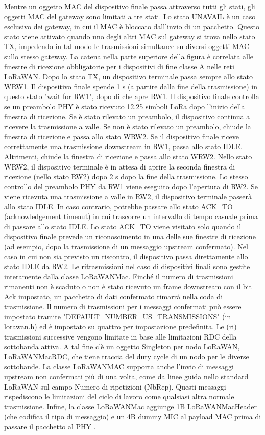 \documentclass[a4paper]{report} %
\begin{document}
Mentre un oggetto MAC del dispositivo finale passa attraverso tutti gli stati, gli oggetti MAC del gateway sono limitati a tre stati. Lo stato UNAVAIL è un caso esclusivo dei gateway, in cui il MAC è bloccato dall'invio di un pacchetto. Questo stato viene attivato quando uno degli altri MAC sul gateway si trova nello stato TX, impedendo in tal modo le trasmissioni simultanee su diversi oggetti MAC sullo stesso gateway. La catena nella parte superiore della figura è correlata alle finestre di ricezione obbligatorie per i dispositivi di fine classe A nelle reti LoRaWAN. Dopo lo stato TX, un dispositivo terminale passa sempre allo stato WRW1. Il dispositivo finale spende 1 s (a partire dalla fine della trasmissione) in questo stato "wait for RW1", dopo di che apre RW1. Il dispositivo finale controlla se un preambolo PHY è stato ricevuto 12.25 simboli LoRa dopo l'inizio della finestra di ricezione. Se è stato rilevato un preambolo, il dispositivo continua a ricevere la trasmissione a valle.
Se non è stato rilevato un preambolo, chiude la finestra di ricezione e passa allo stato WRW2. Se il dispositivo finale riceve correttamente una trasmissione downstream in RW1, passa allo stato IDLE. Altrimenti, chiude la finestra di ricezione e passa allo stato WRW2. Nello stato WRW2, il dispositivo terminale è in attesa di aprire la seconda finestra di ricezione (nello stato RW2) dopo 2 s dopo la fine della trasmissione. Lo stesso controllo del preambolo PHY da RW1 viene eseguito dopo l'apertura di RW2. Se viene ricevuta una trasmissione a valle in RW2, il dispositivo terminale passerà allo stato IDLE. In caso contrario, potrebbe passare allo stato ACK\_TO (acknowledgement timeout) in cui trascorre un intervallo di tempo casuale prima di passare allo stato IDLE. Lo stato ACK\_TO viene visitato solo quando il dispositivo finale prevede un riconoscimento in una delle sue finestre di ricezione (ad esempio, dopo la trasmissione di un messaggio upstream confermato). Nel caso in cui non sia previsto un riscontro, il dispositivo passa direttamente allo stato IDLE da RW2. Le ritrasmissioni nel caso di dispositivi finali sono gestite interamente dalla classe LoRaWANMac. Finché il numero di trasmissioni rimanenti non è scaduto o non è stato ricevuto un frame downstream con il bit Ack impostato, un pacchetto di dati confermato rimarrà nella coda di trasmissione. Il numero di trasmissioni per i messaggi confermati può essere impostato tramite "DEFAULT\_NUMBER\_US\_TRANSMISSIONS" (in lorawan.h) ed è impostato su quattro per impostazione predefinita. Le (ri) trasmissioni successive vengono limitate in base alle limitazioni RDC della sottobanda attiva. A tal fine c'è un oggetto Singleton per nodo LoRaWAN, LoRaWANMacRDC, che tiene traccia del duty cycle di un nodo per le diverse sottobande. La classe LoRaWANMAC supporta anche l'invio di messaggi upstream non confermati più di una volta, come da linee guida nello standard LoRaWAN sul campo Numero di ripetizioni (NbRep). Questi messaggi rispediscono le limitazioni del ciclo di lavoro come qualsiasi altra normale trasmissione. Infine, la classe LoRaWANMac aggiunge 1B LoRaWANMacHeader (che codifica il tipo di messaggio) e un 4B dummy MIC al payload MAC prima di passare il pacchetto al PHY \cite{art:rif.49}.
\end{document}
